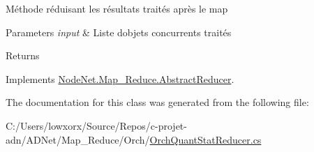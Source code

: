 Méthode réduisant les résultats traités après le map 


\begin{DoxyParams}{Parameters}
{\em input} & Liste d\textquotesingle{}objets concurrents traités\\
\hline
\end{DoxyParams}
\begin{DoxyReturn}{Returns}

\end{DoxyReturn}


Implements \hyperlink{class_node_net_1_1_map___reduce_1_1_abstract_reducer_aad995166ff8f13b4c85338bc29d09e62}{Node\+Net.\+Map\+\_\+\+Reduce.\+Abstract\+Reducer}.



The documentation for this class was generated from the following file\+:\begin{DoxyCompactItemize}
\item 
C\+:/\+Users/lowxorx/\+Source/\+Repos/c-\/projet-\/adn/\+A\+D\+Net/\+Map\+\_\+\+Reduce/\+Orch/\hyperlink{_orch_quant_stat_reducer_8cs}{Orch\+Quant\+Stat\+Reducer.\+cs}\end{DoxyCompactItemize}
